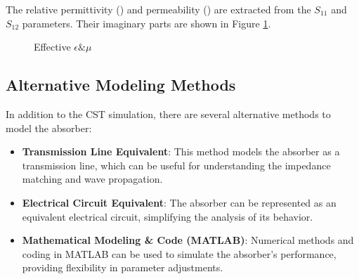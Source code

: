         The relative permittivity (\epsilon) and permeability (\mu) are extracted 
        from the $S_{11}$ and $S_{12}$ parameters. Their imaginary parts are shown 
        in Figure \ref{plt:EpsilonMu}.
        \begin{figure}[h]
            \centering
            \caption{\textsf{Effective $\epsilon \& \mu$}}
            \label{plt:EpsilonMu}
        \end{figure}
        

        \subsection{\textsf{Alternative Modeling Methods}}

            In addition to the CST simulation, there are several alternative methods
            to model the absorber:
            \begin{itemize}
                \item \textbf{Transmission Line Equivalent}: This method models the 
                    absorber as a transmission line, which can be useful for 
                    understanding the impedance matching and wave propagation.
                \item \textbf{Electrical Circuit Equivalent}: The absorber can be 
                    represented as an equivalent electrical circuit, simplifying the
                    analysis of its behavior.
                \item \textbf{Mathematical Modeling \& Code (MATLAB)}: Numerical methods
                    and coding in MATLAB can be used to simulate the absorber's 
                    performance, providing flexibility in parameter adjustments.
            \end{itemize}
        
